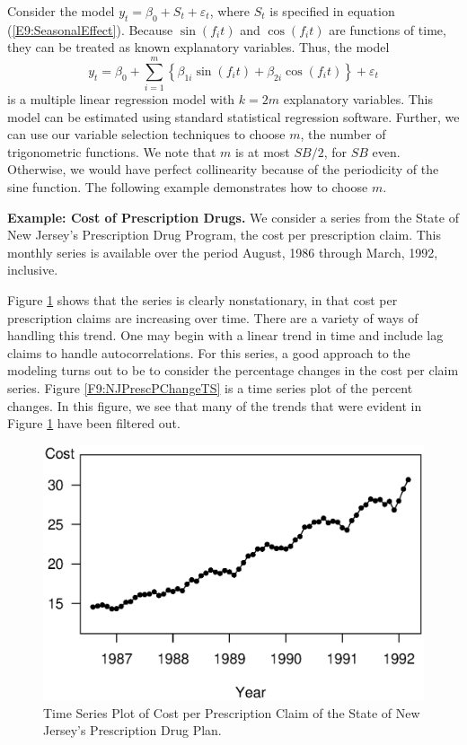 Consider the model $y_t=\beta_0+S_t+\varepsilon_t$, where $S_t$ is
specified in equation (\ref{E9:SeasonalEffect}). Because $\sin
(f_it)$ and $\cos (f_it)$ are functions of time, they can be treated
as known explanatory variables. Thus, the model
\begin{equation*}
y_t = \beta_0 + \sum_{i=1}^{m}\left\{ \beta_{1i}\sin (f_i t) +
\beta_{2i} \cos (f_i t)\right\} + \varepsilon_t
\end{equation*}
is a multiple linear regression model with $k=2m$ explanatory
variables. This model can be estimated using standard statistical
regression software. Further, we can use our variable selection
techniques to choose $m$, the number of trigonometric functions. We
note that $m$ is at most $SB/2$, for $SB$ even. Otherwise, we would
have perfect collinearity because of the periodicity of the sine
function. The following example demonstrates how to choose $m$.

\linejed


\textbf{Example: Cost of Prescription Drugs.} We consider a series from the State of New
Jersey's Prescription Drug Program, the cost per prescription claim.
This monthly series is available over the period August, 1986
through March, 1992, inclusive.

Figure \ref{F9:NJPrescTS} shows that the series is clearly
nonstationary, in that cost per prescription claims are increasing
over time. There are a variety of ways of handling this trend. One
may begin with a linear trend in time and include lag claims to
handle autocorrelations. For this series, a good approach to the
modeling turns out to be to consider the percentage changes in the
cost per claim series. Figure \ref{F9:NJPrescPChangeTS} is a time
series plot of the percent changes. In this figure, we see that many
of the trends that were evident in Figure \ref{F9:NJPrescTS} have
been filtered out.

\begin{figure}[htp]
  \begin{center}
     \includegraphics[width=.6\textwidth]
     {Chapter9Forecasting/NJPrescTS.eps}
    \caption{\label{F9:NJPrescTS} \small Time Series
Plot of Cost per Prescription Claim of the State of New Jersey's
Prescription Drug Plan.}
  \end{center}
\end{figure}

